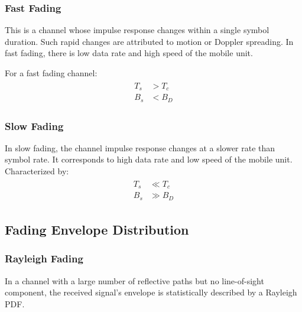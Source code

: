 \subsubsection{Fast Fading}
This is a channel whose impulse response changes within a single symbol duration. Such rapid changes are attributed to motion or Doppler spreading. In fast fading, there is low data rate and high speed of the mobile unit\cite{fuqin}.

\noindent For a fast fading channel:
\begin{align}
	\begin{split}
	T_s &> T_c \\
	B_s &< B_D
	\end{split}
\end{align}
\subsubsection{Slow Fading}
In slow fading, the channel impulse response changes at a slower rate than symbol rate. It corresponds to high data rate and low speed of the mobile unit. Characterized by:
\begin{align}
	\begin{split}
	T_s &\ll T_c \\
	B_s &\gg B_D
	\end{split}
\end{align}

\subsection{Fading Envelope Distribution}
\subsubsection{Rayleigh Fading}
In a channel with a large number of reflective paths but no line-of-sight component, the received signal's envelope is statistically described by a Rayleigh \gls{PDF}\cite{AWGN}.

